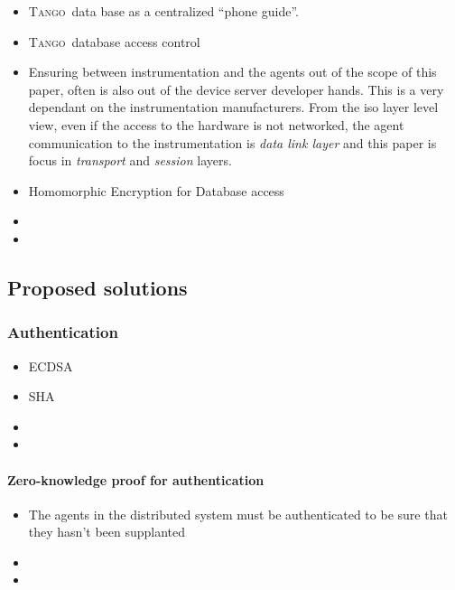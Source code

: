\documentclass[10pt,a4paper,twoside]{llncs}
\newcommand{\tango}{\textsc{Tango}}
\begin{document}
\begin{itemize}
    \item \tango\, data base as a centralized ``phone guide''.
    \item \tango\, database access control
    \item Ensuring between instrumentation and the agents out of the scope of this paper, often is also out of the device server developer hands. This is a very dependant on the instrumentation manufacturers. From the iso layer level view, even if the access to the hardware is not networked, the agent communication to the instrumentation is \emph{data link layer} and this paper is focus in \emph{transport} and \emph{session} layers.
    \item Homomorphic Encryption for Database access
    \item  
    \item 
\end{itemize}

\subsection{Proposed solutions \label{sec:propSolutions}}


\subsubsection{Authentication \label{sec:authentication}}

\begin{itemize}
    \item ECDSA \cite{NIST186-3}
    \item SHA \cite{NIST180-2}
    \item
    \item 
\end{itemize}
 
\paragraph{Zero-knowledge proof for authentication \label{sec:zeroknown}}

\begin{itemize}
    \item The agents in the distributed system must be authenticated to be sure that they hasn't been supplanted
    \item 
    \item 
\end{itemize}
\end{document}
